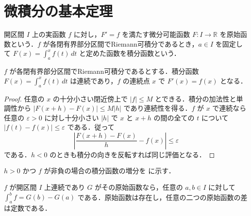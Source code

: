 \section{微積分の基本定理}
\begin{defn}[原始函数と積分函数]
開区間 $I$ 上の実函数 $f$ に対し，$F'=f$ を満たす微分可能函数 $F:I\to\mathbb R$ を原始函数という．$f$ が各閉有界部分区間でRiemann可積分であるとき，$a\in I$ を固定して $F(x)=\int_a^x f(t)\,dt$ と定めた函数を積分函数という．
\end{defn}
\begin{prop}
$f$ が各閉有界部分区間でRiemann可積分であるとする．積分函数 $F(x)=\int_a^x f(t)\,dt$ は連続であり，$f$ の連続点 $x$ で $F'(x)=f(x)$ となる．
\end{prop}
\begin{proof}
任意の $x$ の十分小さい閉近傍上で $|f|\leq M$ とできる．積分の加法性と単調性から $|F(x+h)-F(x)|\leq M|h|$ であり連続性を得る．$f$ が $x$ で連続なら任意の $\varepsilon>0$ に対し十分小さい $|h|$ で $x$ と $x+h$ の間の全ての $t$ について $|f(t)-f(x)|\leq\varepsilon$ である．従って
\[
\left|\frac{F(x+h)-F(x)}h-f(x)\right|
\leq\varepsilon
\]
である．$h<0$ のときも積分の向きを反転すれば同じ評価となる．
\end{proof}
$h>0$ かつ $f$ が非負の場合の積分函数の増分を  に示す．
\begin{prop}
$f$ が開区間 $I$ 上連続であり $G$ がその原始函数なら，任意の $a,b\in I$ に対して $\int_a^b f=G(b)-G(a)$ である．原始函数は存在し，任意の二つの原始函数の差は定数である．
\end{prop}

